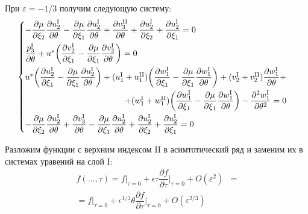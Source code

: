 \documentclass[../master.tex]{subfiles}
\begin{document}
При $\varepsilon=-1/3$ получим следующую систему:
\begin{equation}
	\begin{cases}
		-\dfrac{\partial \mu}{\partial \xi_2} \dfrac{\partial u_2^{\text{I}}}{\partial \theta} -\dfrac{\partial \mu}{\partial \xi_1} \dfrac{\partial u_2^{\text{I}}}{\partial \theta} + 
		\dfrac{\partial v_3^{\text{II}}}{\partial \theta} + \dfrac{\partial u_2^{\text{I}}}{\partial \xi_2} + \dfrac{\partial u_2^{\text{I}}}{\partial \xi_1} = 0 \\[2ex]
		\dfrac{p_3^{\text{I}}}{\partial \theta} + u^*\bigg(\dfrac{\partial v_2^{\text{I}}}{\partial \xi_1} - \dfrac{\partial \mu}{\partial \xi_1} \dfrac{\partial v_2^{\text{I}}}{\partial \theta} \bigg )= 0 \\[2ex]
		u^*\bigg( \dfrac{\partial u_2^{\text{I}}}{\partial \xi_1} - \dfrac{\partial \mu}{\partial \xi_1}\dfrac{\partial u_2^{\text{I}}}{\partial \theta} \bigg) +
			(u_1^{\text{I}} + u_1^{\text{II}})\bigg(  \dfrac{\partial w_1^{\text{I}}}{\partial \xi_1} - \dfrac{\partial \mu}{\partial \xi_1}\dfrac{\partial w_1^{\text{I}}}{\partial \theta} \bigg) +
			(v_2^{\text{I}} + v_2^{\text{II}})\dfrac{\partial w_1^{\text{I}}}{\partial \theta} + \\[2ex] \quad \hfill +
			(w_1^{\text{I}} + w_1^{\text{II}})\bigg(  \dfrac{\partial w_1^{\text{I}}}{\partial \xi_1} - \dfrac{\partial \mu}{\partial \xi_1}\dfrac{\partial w_1^{\text{I}}}{\partial \theta} \bigg) -
			\dfrac{\partial^2 w_1^{\text{I}}}{\partial \theta^2} = 0 \\[2ex]
		-\dfrac{\partial \mu}{\partial \xi_2} \dfrac{\partial u_2^{\text{I}}}{\partial \theta} + 
			 \dfrac{\partial v_3^{\text{I}}}{\partial \theta} - 
			 \dfrac{\partial \mu}{\partial \xi_1} \dfrac{\partial u_2^{\text{I}}}{\partial \theta} + 
			 \dfrac{\partial u_2^{\text{I}}}{\partial \xi_2} + 
			 \dfrac{\partial u_2^{\text{I}}}{\partial \xi_1} = 0
	\end{cases}
\end{equation}

Разложим функции с верхним индексом II в асимтотический ряд и заменим их в системах уравений на слой I: 
\begin{align*}
	f(..., \tau) = f\big|_{\tau=0} + \epsilon\tau\dfrac{\partial f}{\partial \tau}\bigg|_{\tau = 0} + O(\varepsilon^{2})& = \\
	=  f\big|_{\tau=0} + \epsilon^{1/3}\theta\dfrac{\partial f}{\partial \tau}\bigg|_{\tau = 0} + O(\varepsilon^{2/3})
\end{align*}
\end{document}
